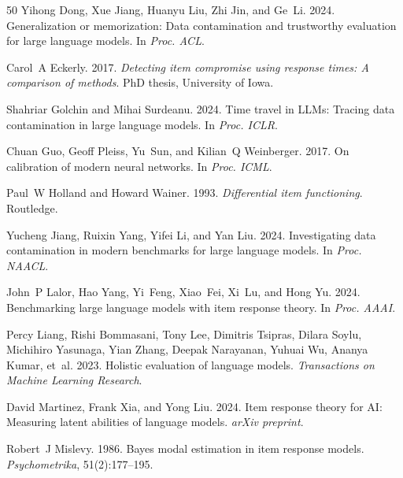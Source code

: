 \documentclass[11pt,a4paper]{article}
\begin{document}
\begin{thebibliography}{50}
Yihong Dong, Xue Jiang, Huanyu Liu, Zhi Jin, and Ge~Li. 2024.
\newblock Generalization or memorization: Data contamination and trustworthy evaluation for large language models.
\newblock In \emph{Proc. ACL}.

Carol~A Eckerly. 2017.
\newblock \emph{Detecting item compromise using response times: A comparison of methods}.
\newblock PhD thesis, University of Iowa.

Shahriar Golchin and Mihai Surdeanu. 2024.
\newblock Time travel in {LLM}s: Tracing data contamination in large language models.
\newblock In \emph{Proc. ICLR}.

Chuan Guo, Geoff Pleiss, Yu~Sun, and Kilian~Q Weinberger. 2017.
\newblock On calibration of modern neural networks.
\newblock In \emph{Proc. ICML}.

Paul~W Holland and Howard Wainer. 1993.
\newblock \emph{Differential item functioning}.
\newblock Routledge.

Yucheng Jiang, Ruixin Yang, Yifei Li, and Yan Liu. 2024.
\newblock Investigating data contamination in modern benchmarks for large language models.
\newblock In \emph{Proc. NAACL}.

John~P Lalor, Hao Yang, Yi~Feng, Xiao~Fei, Xi~Lu, and Hong Yu. 2024.
\newblock Benchmarking large language models with item response theory.
\newblock In \emph{Proc. AAAI}.

Percy Liang, Rishi Bommasani, Tony Lee, Dimitris Tsipras, Dilara Soylu, Michihiro Yasunaga, Yian Zhang, Deepak Narayanan, Yuhuai Wu, Ananya Kumar, et~al. 2023.
\newblock Holistic evaluation of language models.
\newblock \emph{Transactions on Machine Learning Research}.

David Martinez, Frank Xia, and Yong Liu. 2024.
\newblock Item response theory for {AI}: Measuring latent abilities of language models.
\newblock \emph{arXiv preprint}.

Robert~J Mislevy. 1986.
\newblock Bayes modal estimation in item response models.
\newblock \emph{Psychometrika}, 51(2):177--195.


\end{thebibliography}
\end{document}
